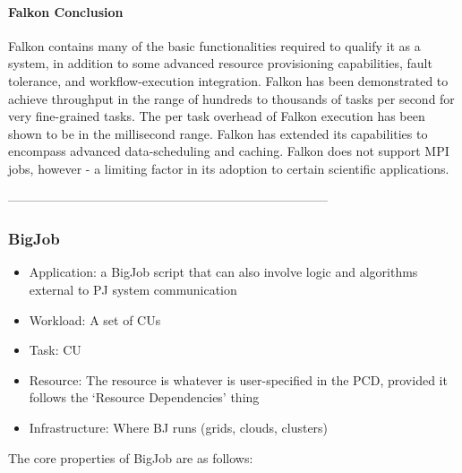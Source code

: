 \documentclass{sig-alternate}
\begin{document}
\paragraph{Falkon Conclusion}
Falkon contains many of the basic functionalities required to
qualify it as a \pilotjob system, in addition to some advanced resource
provisioning capabilities, fault tolerance, and workflow-execution integration.
Falkon has been demonstrated to achieve throughput in the range
of hundreds to thousands of tasks per second for very fine-grained
tasks. The per task overhead of Falkon execution has been shown
to be in the millisecond range. Falkon has extended its capabilities
to encompass advanced data-scheduling and caching. Falkon does
not support MPI jobs, however - a limiting factor in its adoption to
certain scientific applications.

 -----------------------------------------------------------------------------

\subsubsection{BigJob}



\begin{itemize}
\item Application: a BigJob script that can also involve logic
and algorithms external to PJ system communication
\item Workload: A set of CUs
\item Task: CU
\item Resource: The resource is whatever is user-specified in the PCD, provided it
follows the `Resource Dependencies' thing
\item Infrastructure: Where BJ runs (grids, clouds, clusters)
\end{itemize}


The core properties of BigJob are as follows:
\end{document}
